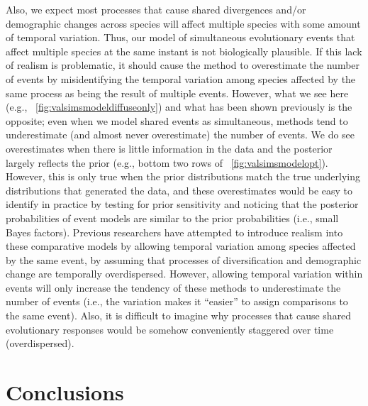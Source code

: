 Also, we expect most processes that cause shared divergences and/or demographic
changes across species will affect multiple species with some amount of
temporal variation.
Thus, our model of simultaneous evolutionary events that affect multiple
species at the same instant is not biologically plausible.
If this lack of realism is problematic, it should cause the method to
overestimate the number of events by misidentifying the temporal variation among
species affected by the same process as being the result of multiple events.
However, what we see here
(e.g., \fig{}~\ref{fig:valsimsmodeldiffuseonly})
and what has been shown previously
\citep{Oaks2012,Oaks2014reply,Oaks2014dpp,Oaks2018ecoevolity,Oaks2018paic}
is the opposite;
even when we model shared events as simultaneous, methods tend to underestimate
(and almost never overestimate) the number of events.
We do see overestimates when there is little information in the data
and the posterior largely reflects the prior 
(e.g., bottom two rows of \fig{}~\ref{fig:valsimsmodelopt}).
However, this is only true when the prior distributions match the true
underlying distributions that generated the data, and these overestimates would
be easy to identify in practice by testing for prior sensitivity and noticing
that the posterior probabilities of event models are similar to the prior
probabilities (i.e., small Bayes factors).
Previous researchers
\citep{Overcast2017,Gehara2017,Xue2017}
have attempted to introduce realism into these comparative models by allowing
temporal variation among species affected by the same event, by assuming that
processes of diversification and demographic change are temporally
overdispersed.
However, allowing temporal variation within events will only increase the
tendency of these methods to underestimate the number of events (i.e., the
variation makes it ``easier'' to assign comparisons to the same event).
Also, it is difficult to imagine why processes that cause shared evolutionary
responses would be somehow conveniently staggered over time (overdispersed).

\section{Conclusions}

